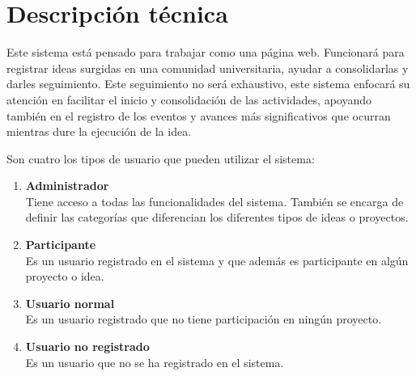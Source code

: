 \documentclass[12pt,letterpaper,titlepage]{article}
\begin{document}
\section{Descripci\'on t\'ecnica}

Este sistema est\'a pensado para trabajar como una p\'agina web. Funcionar\'a para registrar ideas surgidas en una comunidad universitaria, ayudar a consolidarlas y darles seguimiento. Este seguimiento no ser\'a exhaustivo, este sistema enfocar\'a su atenci\'on  en facilitar el inicio  y consolidaci\'on de las actividades, apoyando tambi\'en en el registro de los eventos y avances m\'as significativos que ocurran mientras dure la ejecuci\'on de la idea.

Son cuatro los tipos de usuario que pueden utilizar el sistema:
\begin{enumerate}
 \item \textbf{Administrador}\\Tiene acceso a todas las funcionalidades del sistema. Tambi\'en se encarga de definir las categor\'ias que diferencian los diferentes tipos de ideas o proyectos.
 \item \textbf{Participante}\\Es un usuario registrado en el sistema y que adem\'as  es participante en alg\'un proyecto o idea.
 \item \textbf{Usuario normal}\\Es un usuario registrado que no tiene participaci\'on en ning\'un proyecto.
 \item \textbf{Usuario no registrado}\\Es un usuario que no se ha registrado en el sistema.
\end{enumerate}




\newpage
\end{document}

